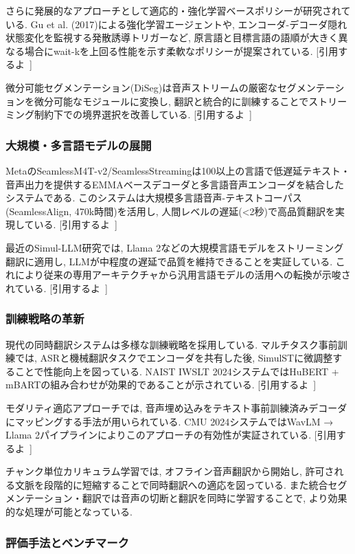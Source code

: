 さらに発展的なアプローチとして適応的・強化学習ベースポリシーが研究されている.
Gu et al. (2017)による強化学習エージェントや, エンコーダ-デコーダ隠れ状態変化を監視する発散誘導トリガーなど, 原言語と目標言語の語順が大きく異なる場合にwait-kを上回る性能を示す柔軟なポリシーが提案されている.
[引用するよ~]

微分可能セグメンテーション(DiSeg)は音声ストリームの厳密なセグメンテーションを微分可能なモジュールに変換し, 翻訳と統合的に訓練することでストリーミング制約下での境界選択を改善している.
[引用するよ~]

\subsubsection{大規模・多言語モデルの展開}

MetaのSeamlessM4T-v2/SeamlessStreamingは100以上の言語で低遅延テキスト・音声出力を提供するEMMAベースデコーダと多言語音声エンコーダを結合したシステムである.
このシステムは大規模多言語音声-テキストコーパス(SeamlessAlign, 470k時間)を活用し, 人間レベルの遅延(<2秒)で高品質翻訳を実現している.
[引用するよ~]

最近のSimul-LLM研究では, Llama 2などの大規模言語モデルをストリーミング翻訳に適用し, LLMが中程度の遅延で品質を維持できることを実証している.
これにより従来の専用アーキテクチャから汎用言語モデルの活用への転換が示唆されている.
[引用するよ~]

\subsubsection{訓練戦略の革新}

現代の同時翻訳システムは多様な訓練戦略を採用している.
マルチタスク事前訓練では, ASRと機械翻訳タスクでエンコーダを共有した後, SimulSTに微調整することで性能向上を図っている.
NAIST IWSLT 2024システムではHuBERT + mBARTの組み合わせが効果的であることが示されている.
[引用するよ~]

モダリティ適応アプローチでは, 音声埋め込みをテキスト事前訓練済みデコーダにマッピングする手法が用いられている.
CMU 2024システムではWavLM → Llama 2パイプラインによりこのアプローチの有効性が実証されている.
[引用するよ~]

チャンク単位カリキュラム学習では, オフライン音声翻訳から開始し, 許可される文脈を段階的に短縮することで同時翻訳への適応を図っている.
また統合セグメンテーション・翻訳では音声の切断と翻訳を同時に学習することで, より効果的な処理が可能となっている.

\subsubsection{評価手法とベンチマーク}

